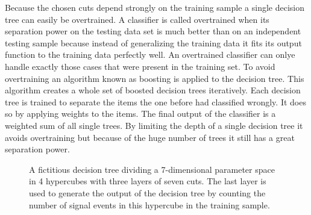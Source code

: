 Because the chosen cuts depend strongly on the training sample a single decision tree can easily be overtrained. A classifier is called overtrained when its separation power on the testing data set is much better than on an independent testing sample because instead of generalizing the training data it fits its output function to the training data perfectly well. An overtrained classifier can onlye handle exactly those cases that were present in the training set. To avoid overtraining an algorithm known as boosting is applied to the decision tree. This algorithm creates a whole set of boosted decision trees iteratively. Each decision tree is trained to separate the items the one before had classified wrongly. It does so by applying weights to the items. The final output of the classifier is a weighted sum of all single trees. By limiting the depth of a single decision tree it avoids overtraining but because of the huge number of trees it still has a great separation power.

\begin{figure}
  \centering
\caption{A fictitious decision tree dividing a 7-dimensional parameter space in 4 hypercubes with three layers of seven cuts. The last layer is used to generate the output of the decision tree by counting the number of signal events in this hypercube in the training sample.}
\label{fig-decision-tree}
\end{figure}


